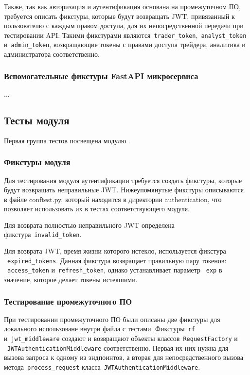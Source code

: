 Также, так как авторизация и аутентификация основана на промежуточном ПО, требуется описать фикстуры,
которые будут возвращать JWT, привязанный к пользователю с каждым правом доступа, для их непосредственной передачи при тестировании API.
Такими фикстурами являются~\lstinline{trader_token},~\lstinline{analyst_token} и~\lstinline{admin_token}, возвращающие токены с правами
доступа трейдера, аналитика и администратора соответственно.

\subsubsection{Вспомогательные фикстуры FastAPI микросервиса}
...

\subsection{Тесты модуля \moduleAuth}\label{subsec:testing:moduleauth}

Первая группа тестов посвещена модулю \moduleAuth.

\subsubsection{Фикстуры модуля \moduleAuth}
Для тестирования модуля аутентификации требуется создать фикстуры, которые будут возвращать неправильные JWT.
Нижеупомянутые фикстуры описываются в файле conftest.py, который находится в директории authentication,
что позволяет использовать их в тестах соответствующего модуля.

Для возврата полностью неправильного JWT определена фикстура~\lstinline{invalid_token}.

Для возврата JWT, время жизни которого истекло, используется фикстура ~\lstinline{expired_tokens}.
Данная фикстура возвращает правильную пару токенов:
~\lstinline{access_token} и~\lstinline{refresh_token}, однако устанавливает параметр ~\lstinline{exp} в значение, которое делает токены истекшими.

\subsubsection{Тестирование промежуточного ПО}
При тестировании промежуточного ПО были описаны две фикстуры для локального использоване внутри файла с тестами.
Фикстуры~\lstinline{rf} и~\lstinline{jwt_middleware} создают и возвращают объекты классов~\lstinline{RequestFactory} и ~\lstinline{JWTAuthenticationMiddleware} соответственно.
Первая их них нужна для вызова запроса к одному из эндпоинтов, а вторая для непосредственного вызова метода~\lstinline{process_request} класса~\lstinline{JWTAuthenticationMiddleware}.

